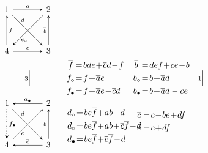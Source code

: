 \documentclass[11pt, letterpaper]{amsart}
\theoremstyle{definition}
\numberwithin{equation}{section}
\newcommand{\vmutation}[1]{  {\scriptstyle #1}{\Bigl|\Bigr.}  }
\def\nsquare{\scalebox{.85}{$\scriptscriptstyle\Box$}}
\def\ssquare{\scalebox{.75}{$\scriptscriptstyle\Box$}}
\begin{document}
\begin{figure}[ht]
\begin{equation*}
\begin{array}{ccccccccc}
\begin{tikzcd}[arrows={-stealth}, sep=\sepps]
  1  \arrow[r,  "a", \snls] \arrow[dr, "d" near start, outer sep=\outsepd, \snls]  \arrow[d, "f", \snsl]  
  & 2  \arrow[d, swap, "\overline{b}", \snsl] \arrow[dl, "e_{\ssquare}", near end, outer sep=\outsepe, \snls]
  \\
   4 
   & 3  \arrow[l, "c", swap, \snsl] 
\end{tikzcd}
 & \\
 \\[-8pt]
\vmutation{3}   & 
\multicolumn{2}{c}{
\begin{aligned} 
 \overline{f} \,&\!=\! bde\!+\!\overline{c}d\!-\!f\\
f_\circ&\!=\!f\! +\! \overline{a}e\\ %
f_\bullet &\!=\! f \!+\! \overline{a} e\! - \! \overline{c}d\\
 \end{aligned} }& &
 \multicolumn{2}{c}{
\hspace{-15pt}
\begin{aligned}
 \overline{b}\,\, &\!=\! def\!+\!ce\!-\!b\\
b_\circ&\!=\! b \!+\! \overline{a}d \\
b_\bullet&\!=\!b\!+\!\overline{a} d-ce\\
 \end{aligned}
}&  
\vmutation{1}\\
\begin{tikzcd}[arrows={-stealth}, sep=\sepps]
  1  \arrow[r,  "a_\bullet", \snsl] \arrow[dr, "d" near start, outer sep=\outsepd, \snls]  \arrow[d, "f_\bullet", thick, dotted, \snls]  
  & 2  \arrow[d, swap, "b", \snsl] \arrow[dl, "e", near end, outer sep=\outsepe, \snsl]
  \\
   4 
   & 3  \arrow[l, "\overline{c}", swap, \snls] 
\end{tikzcd}
 &\multicolumn{2}{c}{
\hspace{5pt}  \begin{aligned}
 \ \\[-5pt]
 d_\circ &\!=\! b e\overline{f} \! + \!ab\! -\!d\\%
 d_{\nsquare} &\!= \! b e\overline{f} \! + \!ab\!+\! \overline{c} \overline{f} \! -\!d \\
 d_\bullet &\!=\! b e\overline{f} \!+\! \overline{c} \overline{f}\! -\!d
 \end{aligned}
 \hspace{-26pt}
}
& &\multicolumn{2}{c}{
\hspace{-15pt}
 \begin{aligned}
 \overline{c} \,&\!=\! c \!-\! be\!+\! df  \\
 \widehat{c} \,&\!=\! c \!+\! df\\ 
 \end{aligned}
 }
 

\end{array}
\end{equation*}
\end{figure}
\end{document}
